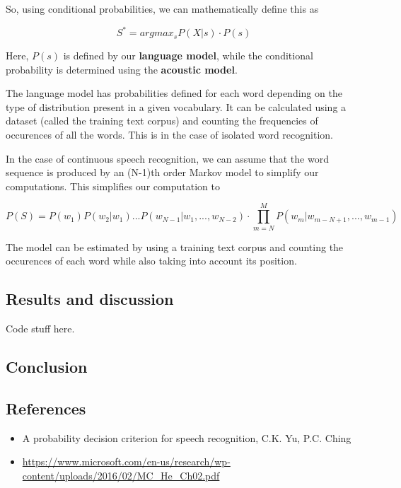 So, using conditional probabilities, we can mathematically define this
as

\[S^* = argmax_s P(X|s)\cdot P(s)\]

Here, \(P(s)\) is defined by our \textbf{language model}, while the
conditional probability is determined using the \textbf{acoustic model}.

The language model has probabilities defined for each word depending on
the type of distribution present in a given vocabulary. It can be
calculated using a dataset (called the training text corpus) and
counting the frequencies of occurences of all the words. This is in the
case of isolated word recognition.

In the case of continuous speech recognition, we can assume that the
word sequence is produced by an (N-1)th order Markov model to simplify
our computations. This simplifies our computation to

\[P(S) = P(w_1)P(w_2|w_1)...P(w_{N-1}|w_1, ..., w_{N-2})\cdot\prod_{m = N}^M P(w_{m}|w_{m-N+1}, ..., w_{m-1})\]

The model can be estimated by using a training text corpus and counting
the occurences of each word while also taking into account its position.

\hypertarget{results-and-discussion}{%
\subsection{Results and discussion}\label{results-and-discussion}}

Code stuff here.

\hypertarget{conclusion}{%
\subsection{Conclusion}\label{conclusion}}

\hypertarget{references}{%
\subsection{References}\label{references}}

\begin{itemize}
\item
  A probability decision criterion for speech recognition, C.K. Yu, P.C.
  Ching
\item
  \url{https://www.microsoft.com/en-us/research/wp-content/uploads/2016/02/MC_He_Ch02.pdf}
\end{itemize}
